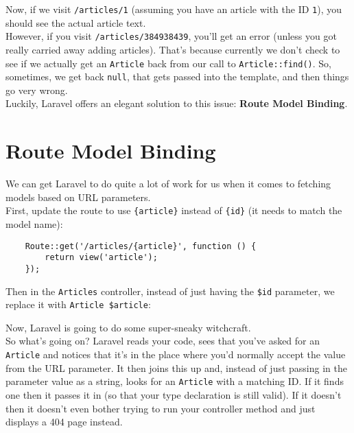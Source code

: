 Now, if we visit \texttt{/articles/1} (assuming you have an article with the ID \texttt{1}), you should see the actual article text.
\\

However, if you visit \texttt{/articles/384938439}, you'll get an error (unless you got really carried away adding articles). That's because currently we don't check to see if we actually get an \texttt{Article} back from our call to \texttt{Article::find()}. So, sometimes, we get back \texttt{null}, that gets passed into the template, and then things go very wrong.
\\

Luckily, Laravel offers an elegant solution to this issue: \textbf{Route Model Binding}.


\section{Route Model Binding}

We can get Laravel to do quite a lot of work for us when it comes to fetching models based on URL parameters.
\\

First, update the route to use \texttt{\{article\}} instead of \texttt{\{id\}} (it needs to match the model name):

\begin{verbatim}
    Route::get('/articles/{article}', function () {
        return view('article');
    });
\end{verbatim}

Then in the \texttt{Articles} controller, instead of just having the \texttt{\$id} parameter, we replace it with \texttt{Article \$article}:


Now, Laravel is going to do some super-sneaky witchcraft.
\\

So what's going on? Laravel reads your code, sees that you've asked for an \texttt{Article} and notices that it's in the place where you'd normally accept the value from the URL parameter. It then joins this up and, instead of just passing in the parameter value as a string, looks for an \texttt{Article} with a matching ID. If it finds one then it passes it in (so that your type declaration is still valid). If it doesn't then it doesn't even bother trying to run your controller method and just displays a 404 page instead.
\\

